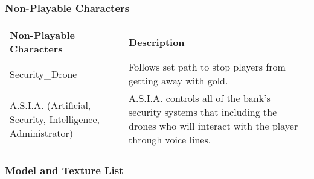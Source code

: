 \documentclass[10pt]{report}
\begin{document}
\subsubsection{Non-Playable Characters}

\begin{center}
    \begin{tabular}{| p{.45\linewidth} | p{.45\linewidth} |}
        \hline    
        \textbf{Non-Playable Characters} &   \textbf{Description}  \\ \hline
        Security\_Drone &    Follows set path to stop players from getting away with gold.  \\ \hline
        A.S.I.A. (Artificial, Security, Intelligence, Administrator) &   A.S.I.A. controls all of the bank’s security systems that including the drones who will interact with the player through voice lines.  \\
        \hline
    \end{tabular}
\end{center}

\subsubsection{Model and Texture List}
\end{document}
